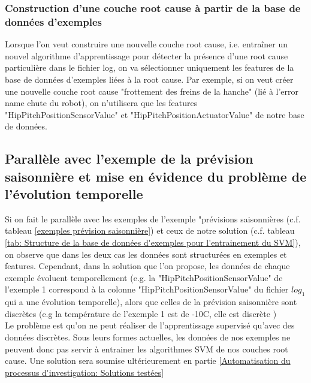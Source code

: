 \subsubsection{Construction d'une couche root cause à partir de la base de données d'exemples}
\label{Automatisation du processus d'investigation: Achitecture High Level du système proposé: Les exemples: Construction d'une couche root cause à partir de la base de données d'exemples}
Lorsque l'on veut construire une nouvelle couche root cause, i.e. entraîner un nouvel algorithme d'apprentissage pour détecter la présence d'une root cause particulière dans le fichier log, on va sélectionner uniquement les features de la base de données d'exemples liées à la root cause. Par exemple, si on veut créer une nouvelle couche root cause "frottement des freins de la hanche" (lié à l'error name chute du robot), on n'utilisera que les features "HipPitchPositionSensorValue" et "HipPitchPositionActuatorValue" de notre base de données.

\subsection{Parallèle avec l'exemple de la prévision saisonnière et mise  en évidence du problème de l'évolution temporelle }
\label{Automatisation du processus d'investigation: Achitecture High Level du système proposé: Les exemples: Parallèle avec l'exemple de la prévision saisonnière}
Si on fait le parallèle avec les exemples de l'exemple "prévisions saisonnières (c.f. tableau \ref{exemples prévision saisonnière}) et ceux de notre solution (c.f. tableau \ref {tab: Structure de la base de données d'exemples pour l'entrainement du SVM}), on observe que dans les deux cas les données sont structurées en exemples et features. Cependant, dans la solution que l'on propose, les données de chaque exemple évoluent temporellement (e.g. la "HipPitchPositionSensorValue" de l'exemple 1 correspond à la colonne "HipPitchPositionSensorValue" du fichier $log_1$ qui a une évolution temporelle), alors que celles de la prévision saisonnière sont discrètes (e.g la température de l'exemple 1 est de -10\degres C, elle est discrète ) \\
Le problème est qu'on ne peut réaliser de l'apprentissage supervisé qu'avec des données discrètes. Sous leurs formes actuelles, les données de nos exemples ne peuvent donc pas servir à entrainer les algorithmes SVM de nos couches root cause. Une solution sera soumise ultérieurement en partie \ref{Automatisation du processus d'investigation: Solutions testées}


